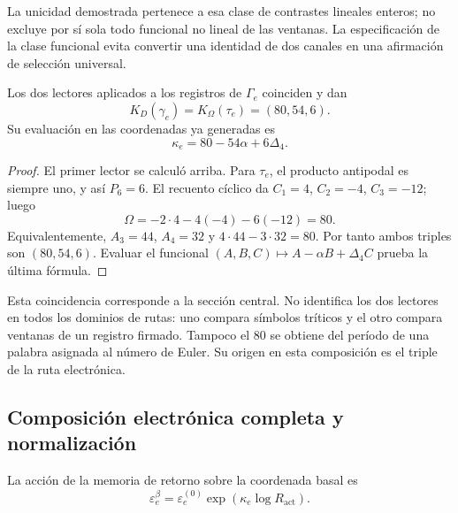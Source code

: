 La unicidad demostrada pertenece a esa clase de contrastes lineales
enteros; no excluye por sí sola todo funcional no lineal de las ventanas.
La especificación de la clase funcional evita convertir una identidad
de dos canales en una afirmación de selección universal.

\begin{theorem}
Los dos lectores aplicados a los registros de \(\Gamma_e\)
coinciden y dan
\begin{equation}
 K_D(\gamma_e)=K_\Omega(\tau_e)=(80,54,6).
 \label{eq:el-triple}
\end{equation}
Su evaluación en las coordenadas ya generadas es
\begin{equation}
 \kappa_e=80-54\alpha+6\Delta_4.
 \label{eq:el-kappa}
\end{equation}
\end{theorem}
\begin{proof}
El primer lector se calculó arriba. Para \(\tau_e\), el producto
antipodal es siempre uno, y así \(P_6=6\). El recuento cíclico da
\(C_1=4\), \(C_2=-4\), \(C_3=-12\); luego
\[
 \Omega=-2\cdot4-4(-4)-6(-12)=80.
\]
Equivalentemente, \(A_3=44\), \(A_4=32\) y
\(4\cdot44-3\cdot32=80\). Por tanto ambos triples son
\((80,54,6)\). Evaluar el funcional
\((A,B,C)\mapsto A-\alpha B+\Delta_4C\) prueba la última fórmula.
\end{proof}

Esta coincidencia corresponde a la sección central. No identifica los
dos lectores en todos los dominios de rutas: uno compara símbolos
tríticos y el otro compara ventanas de un registro firmado. Tampoco el
\(80\) se obtiene del período de una palabra asignada al número de
Euler. Su origen en esta composición es el triple de la ruta
electrónica.

\subsection{Composición electrónica completa y normalización}

\begin{definition}
La acción de la memoria de retorno sobre la coordenada basal es
\begin{equation}
 \varepsilon_e^\beta
 =\varepsilon_e^{(0)}\exp\!\left(\kappa_e\log R_{\mathrm{act}}\right).
 \label{eq:el-beta}
\end{equation}
\end{definition}


